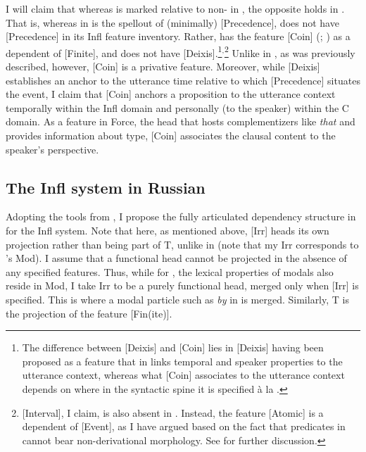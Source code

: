 \documentclass[output=paper,modfonts,newtxmath,hidelinks,]{langscibook}
\begin{document}
\noindent I will claim that whereas  is marked relative to non- in , the opposite holds in . That is, whereas  in  is the spellout of (minimally) [Precedence],  does not have [Precedence] in its Infl feature inventory. Rather,  has the feature [Coin] (\citealt{RitterWiltschko2005}; \citealt{Wiltschko,Wiltschko2014}) as a dependent of [Finite], and does not have [Deixis].\footnote{\label{10:fn2}The difference between [Deixis] and [Coin] lies in [Deixis] having been proposed as a feature that in  links temporal and speaker properties to the utterance context, whereas what [Coin] associates to the utterance context depends on where in the syntactic spine it is specified à la \citet{RamchandSvenonius2014}.}$^,$\footnote{\label{10:fn3}[Interval], I claim, is also absent in . Instead, the feature [Atomic] is a dependent of [Event], as I have argued based on the fact that  predicates in  cannot bear non-derivational  morphology. See \citet{Melara2014} for further discussion.} Unlike in \citet{Wiltschko}, as was previously described, however, [Coin] is a privative feature. Moreover, while [Deixis] establishes an anchor to the utterance time relative to which [Precedence] situates the event, I claim that [Coin] anchors a proposition to the utterance context temporally within the Infl domain and personally (to the speaker) within the C domain. As a feature in Force, the head that hosts complementizers like  \textit{that} and provides information about  type, [Coin] associates the clausal content to the speaker’s perspective.

\subsection{The Infl system in Russian}\label{10:s4.2}

Adopting the tools from \citet{Cowper2005,Cowper2010}, I propose the fully articulated dependency structure in  for the  Infl system. Note that here, as mentioned above, [Irr] heads its own projection rather than being part of T, unlike in \citet{Cowper2010} (note that my Irr corresponds to \citeauthor{Cowper2010}'s Mod). I assume that a functional head cannot be projected in the absence of any specified features. Thus, while for \citeauthor{Cowper2010}, the lexical properties of modals also reside in Mod, I take Irr to be a purely functional head, merged only when [Irr] is specified. This is where a modal particle such as \textit{by} in  is merged. Similarly, T is the projection of the feature [Fin(ite)].
\end{document}
